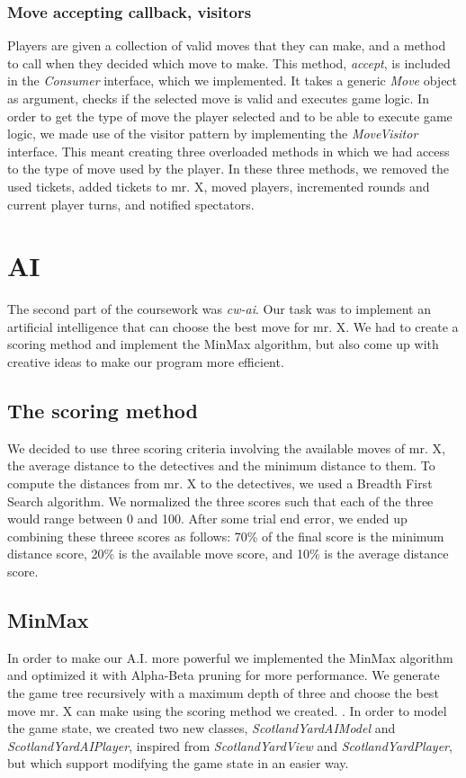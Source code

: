 \documentclass[12pt,a4paper]{scrartcl}
\begin{document}
\subsubsection*{Move accepting callback, visitors}
Players are given a collection of valid moves that they can make, and a method to call when they decided which move to make. This method, \textit{accept},  is included in the \textit{Consumer} interface, which we implemented. It takes a generic \textit{Move} object as argument, checks if the selected move is valid and executes game logic. In order to get the type of move the player selected and to be able to execute game logic, we made use of the visitor pattern by implementing the \textit{MoveVisitor} interface. This meant creating three overloaded methods in which we had access to the type of move used by the player. In these three methods, we removed the used tickets, added tickets to mr. X, moved players, incremented rounds and current player turns, and notified spectators.

\section{AI}
The second part of the coursework was \textit{cw-ai}. Our task was to implement an artificial intelligence that can choose the best move for mr. X. We had to create a scoring method and implement the MinMax algorithm, but also come up with creative ideas to make our program more efficient.

\subsection*{The scoring method}
We decided to use three scoring criteria involving the available moves of mr. X, the average distance to the detectives and the minimum distance to them. To compute the distances from mr. X to the detectives, we used a Breadth First Search algorithm.
We normalized the three scores such that each of the three would range between 0 and 100. After some trial end error, we ended up combining these threee scores as follows: 70\% of the final score is the minimum distance score, 20\% is the available move score, and 10\% is the average distance score.

\subsection*{MinMax}
In order to make our A.I. more powerful we implemented the MinMax algorithm and optimized it with Alpha-Beta pruning for more performance. We generate the game tree recursively with a maximum depth of three and choose the best move mr. X can make using the scoring method we created. . In order to model the game state, we created two new classes, \textit{ScotlandYardAIModel} and \textit{ScotlandYardAIPlayer}, inspired from \textit{ScotlandYardView} and \textit{ScotlandYardPlayer}, but which support modifying the game state in an easier way.
\end{document}
